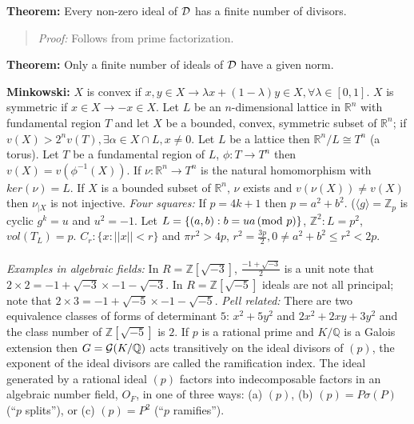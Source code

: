 {\bf Theorem:}
Every non-zero ideal of ${\cal D}$ has a finite number
of divisors.  
\begin{quote}
\emph{Proof:} Follows from prime factorization.
\end{quote}
{\bf Theorem:}
Only a finite number of ideals of ${\cal D}$ have a given norm.  
\begin{quote}
\end{quote}
{\bf Minkowski:}
$X$ is convex if $x, y \in X \rightarrow \lambda x + (1-\lambda)y \in X,
\forall \lambda \in [0,1]$.
$X$ is  symmetric if $x \in X \rightarrow -x \in X$.
Let $L$ be an $n$-dimensional lattice in ${\mathbb R}^n$ with
fundamental region $T$ and let $X$ be a bounded, convex, symmetric subset of
${\mathbb R}^n$; if $v(X)> 2^n v(T), \exists \alpha \in X \cap L, x \ne 0$.  Let
$L$ be a lattice then ${\mathbb R}^n/L \cong T^n$ (a torus).  Let
$T$ be a fundamental region of $L$, $\phi: T \rightarrow T^n$ then
$v(X) = v(\phi^{-1}(X))$.  If $\nu: {\mathbb R}^n \rightarrow T^n$ is the
natural homomorphism with $ker(\nu)=L$.  If $X$ is a bounded subset of
${\mathbb R}^n$, $\nu$ exists and $v(\nu(X)) \ne v(X)$ then $\nu_{|X}$ is
not injective.  \emph{Four squares:} If $p= 4k+1$ then $p=a^2 + b^2$.  
($\langle g \rangle = {\mathbb Z}_p$
is cyclic $g^k=u$ and $u^2= -1$.  Let $L= \{(a,b): b=ua \thinspace \textnormal{(mod } p \textnormal{)} \}$,
${\mathbb Z}^2:L= p^2$, $vol(T_L)=p$.  $C_r: \{ x: ||x||<r \}$ and $\pi r^2>4p$,
$r^2= {\frac {3p} 2}, 0 \ne a^2 +b^2 \le r^2 <2p$.
\\
\\
\emph{Examples in algebraic fields:} In
$R= {\mathbb Z}[{\sqrt {-3}}]$, ${\frac {-1+{\sqrt {-3}}} 2}$ is a unit note that
$2 \times 2 = {-1+{\sqrt {-3}}} \times {-1-{\sqrt {-3}}}$.
In $R= {\mathbb Z}[{\sqrt {-5}}]$ ideals are not all principal; note that
$2 \times 3 = {-1+{\sqrt {-5}}} \times {-1-{\sqrt {-5}}}$.  \emph{Pell related:}
There are two equivalence classes of forms of determinant $5$:   $x^2+5y^2$ and
$2 x^2 + 2xy +3y^2$ and the class number of ${\mathbb Z} [{\sqrt {-5}}]$ is $2$.
If $p$ is a rational prime and $K/ {\mathbb Q}$ is a Galois extension 
then $G= {\cal G}(K/{\mathbb Q})$ acts transitively on the ideal divisors of $(p)$,
the exponent of the ideal divisors are called the ramification index.  The ideal generated
by a rational ideal $(p)$ factors into indecomposable factors
in an algebraic number field, $O_F$, in one of
three ways: (a) $(p)$, (b) $(p)= P \sigma(P)$ (``$p$ splits''), or (c)
$(p)= P^2$ (``$p$ ramifies'').
\\
\\
